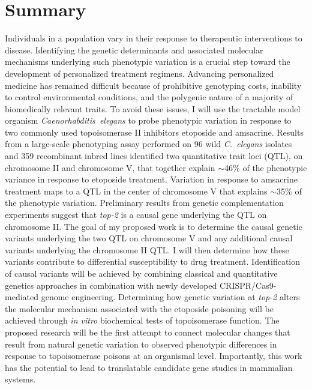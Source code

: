 \documentclass[12pt]{article}
\begin{document}
\tableofcontents
\setcounter{page}{0}%
{}
\listoffigures
\newpage


\section{Summary}
\setcounter{page}{0}

Individuals in a population vary in their response to therapeutic interventions to disease. Identifying the genetic determinants and associated molecular mechanisms underlying such phenotypic variation is a crucial step toward the development of personalized treatment regimens. Advancing personalized medicine has remained difficult because of prohibitive genotyping costs, inability to control environmental conditions, and the polygenic nature of a majority of biomedically relevant traits. To avoid these issues, I will use the tractable model organism {\it Caenorhabditis~elegans} to probe phenotypic variation in response to two commonly used topoisomerase II inhibitors etoposide and amsacrine. Results from a large-scale phenotyping assay performed on 96 wild {\it C.~elegans} isolates and 359 recombinant inbred lines identified two quantitative trait loci (QTL), on chromosome II and chromosome V, that together explain $\sim$46\% of the phenotypic variance in response to etoposide treatment. Variation in response to amsacrine treatment maps to a QTL in the center of chromosome V that explains $\sim$35\% of the phenotypic variation. Preliminary results from genetic complementation experiments suggest that {\it top-2} is a causal gene underlying the QTL on chromosome II. The goal of my proposed work is to determine the causal genetic variants underlying the two QTL on chromosome V and any additional causal variants underlying the chromosome II QTL. I will then determine how these variants contribute to differential susceptibility to drug treatment. Identification of causal variants will be achieved by combining classical and quantitative genetics approaches in combination with newly developed CRISPR/Cas9-mediated genome engineering. Determining how genetic variation at {\it top-2} alters the molecular mechanism associated with the etoposide poisoning will be achieved through {\it in vitro} biochemical tests of topoisomerase function. The proposed research will be the first attempt to connect molecular changes that result from natural genetic variation to observed phenotypic differences in response to topoisomerase poisons at an organismal level. Importantly, this work has the potential to lead to translatable candidate gene studies in mammalian systems.
\end{document}
